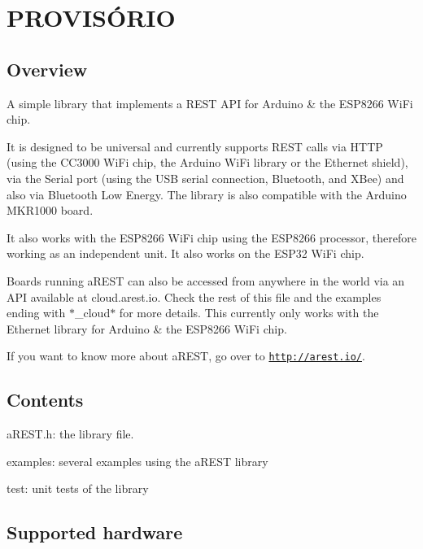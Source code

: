 \section*{P\+R\+O\+V\+I\+SÓ\+R\+IO}

\href{https://travis-ci.org/marcoschwartz/aREST}{\tt } \href{#backers}{\tt } \href{#sponsors}{\tt } \href{https://www.paypal.com/cgi-bin/webscr?cmd=_s-xclick&hosted_button_id=3Q73345CWMYE8}{\tt }

\subsection*{Overview}

A simple library that implements a R\+E\+ST A\+PI for Arduino \& the E\+S\+P8266 Wi\+Fi chip.

It is designed to be universal and currently supports R\+E\+ST calls via H\+T\+TP (using the C\+C3000 Wi\+Fi chip, the Arduino Wi\+Fi library or the Ethernet shield), via the Serial port (using the U\+SB serial connection, Bluetooth, and X\+Bee) and also via Bluetooth Low Energy. The library is also compatible with the Arduino M\+K\+R1000 board.

It also works with the E\+S\+P8266 Wi\+Fi chip using the E\+S\+P8266 processor, therefore working as an independent unit. It also works on the E\+S\+P32 Wi\+Fi chip.

Boards running a\+R\+E\+ST can also be accessed from anywhere in the world via an A\+PI available at {\ttfamily cloud.\+arest.\+io}. Check the rest of this file and the examples ending with $\ast$\+\_\+cloud$\ast$ for more details. This currently only works with the Ethernet library for Arduino \& the E\+S\+P8266 Wi\+Fi chip.

If you want to know more about a\+R\+E\+ST, go over to \href{http://arest.io/}{\tt http\+://arest.\+io/}.

\subsection*{Contents}


\begin{DoxyItemize}
\item a\+R\+E\+S\+T.\+h\+: the library file.
\item examples\+: several examples using the a\+R\+E\+ST library
\item test\+: unit tests of the library
\end{DoxyItemize}

\subsection*{Supported hardware}

